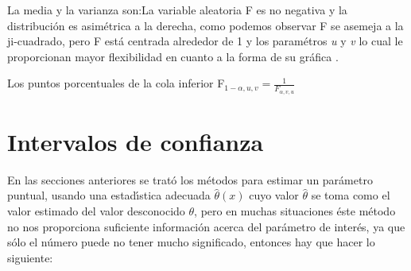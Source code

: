 La media y la varianza son:La variable aleatoria F es no negativa y la
distribuci\'{o}n es asim\'{e}trica a la derecha, como podemos observar F se
asemeja a la ji-cuadrado, pero F est\'{a} centrada alrededor de 1 y los
param\'{e}tros \textit{u } y \textit{v} lo cual le proporcionan mayor
flexibilidad en cuanto a la forma de su gr\'{a}fica .

Los puntos porcentuales de la cola inferior F$_{1-\alpha,u,v}=\frac
{1}{F_{\alpha,v,u}}$

\chapter{Intervalos de confianza}

En las secciones anteriores se trat\'{o} los m\'{e}todos para estimar un
par\'{a}metro puntual, usando una estad\'{\i}stica adecuada $\widehat{\theta
}(x)$ cuyo valor $\widehat{\theta}$ se toma como el va\-lor estimado del valor
desconocido $\theta$, pero en muchas situaciones \'{e}ste m\'{e}todo no nos
proporciona suficiente informaci\'{o}n acerca del par\'{a}metro de
inter\'{e}s, ya que s\'{o}lo el n\'{u}mero puede no tener mucho significado,
entonces hay que hacer lo si\-guiente: